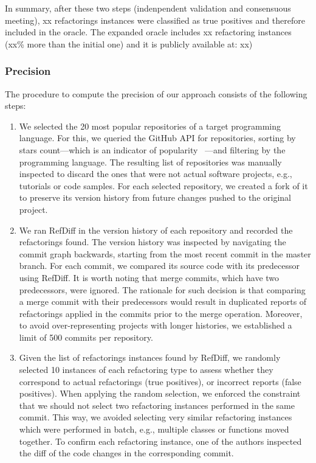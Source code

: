 In summary, after these two steps (indenpendent validation and consensuous meeting), xx refactorings instances were  classified as true positives and therefore included in the oracle. The expanded oracle includes xx refactoring instances (xx\% more than the initial one) and it is publicly available at: xx)

\subsubsection{Precision}
\label{SecPrecisionProcedure}

The procedure to compute the precision of our approach consists of the following steps:

\begin{enumerate}  
\item We selected the 20 most popular repositories of a target programming language. For this, we queried the GitHub API for repositories, sorting by stars count---which is an indicator of popularity~\cite{icsme2016,jss-2018-github-stars} ---and filtering by the programming language.
The resulting list of repositories was manually inspected to discard the ones that were not actual software projects, e.g., tutorials or code samples.
For each selected repository, we created a fork of it to preserve its version history from future changes pushed to the original project.

\item We ran RefDiff in the version history of each repository and recorded the refactorings found.
The version history was inspected by navigating the commit graph backwards, starting from the most recent commit in the master branch.
For each commit, we compared its source code with its predecessor using RefDiff.
It is worth noting that merge commits, which have two predecessors, were ignored.
The rationale for such decision is that comparing a merge commit with their predecessors would result in duplicated reports of refactorings applied in the commits prior to the merge operation.
Moreover, to avoid over-representing projects with longer histories, we established a limit of 500 commits per repository.

\item Given the list of refactorings instances found by RefDiff, we randomly selected 10 instances of each refactoring type to assess whether they correspond to actual refactorings (true positives), or incorrect reports (false positives).
When applying the random selection, we enforced the constraint that we should not select two refactoring instances performed in the same commit.
This way, we avoided selecting very similar refactoring instances which were performed in batch, e.g., multiple classes or functions moved together.
To confirm each refactoring instance, one of the authors inspected the diff of the code changes in the corresponding commit.
\end{enumerate}


